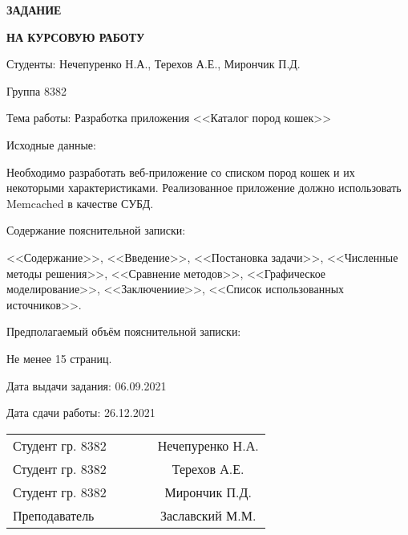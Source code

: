 \pagebreak
\setcounter{page}{2}
\begin{center}
    \textbf{ЗАДАНИЕ}

    \textbf{НА КУРСОВУЮ РАБОТУ}
\end{center}

Студенты: Нечепуренко Н.А., Терехов А.Е., Мирончик П.Д.


Группа 8382


Тема работы: Разработка приложения <<Каталог пород кошек>>


Исходные данные:

Необходимо разработать веб-приложение со списком пород кошек и их
некоторыми характеристиками.
Реализованное приложение должно использовать Memcached в качестве СУБД.


Содержание пояснительной записки:

<<Содержание>>, <<Введение>>, <<Постановка задачи>>, <<Численные методы решения>>,
<<Сравнение методов>>, <<Графическое моделирование>>, <<Заключениие>>,
<<Список использованных источников>>.

\vspace{3cm}

Предполагаемый объём пояснительной записки:

Не менее 15 страниц.

Дата выдачи задания: 06.09.2021

Дата сдачи работы: 26.12.2021
\vfill

\begin{tabular}{ l c c c c }
 Студент гр. 8382 & \hspace{2cm} & \underline{\hspace{4cm}} & \hspace{1cm} & Нечепуренко Н.А. \\
 Студент гр. 8382 & \hspace{2cm} & \underline{\hspace{4cm}} & \hspace{1cm} & Терехов А.Е. \\
 Студент гр. 8382 & \hspace{2cm} & \underline{\hspace{4cm}} & \hspace{1cm} & Мирончик П.Д. \\
 Преподаватель & \hspace{2cm} & \underline{\hspace{4cm}} & \hspace{1cm} & Заславский М.М.
\end{tabular}
